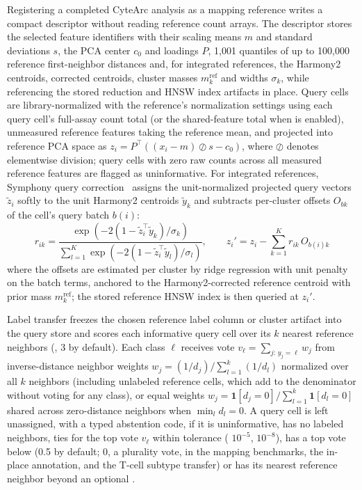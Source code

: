 \documentclass[11pt]{article}
\begin{document}
Registering a completed CyteArc analysis as a mapping reference writes a compact descriptor without reading reference count arrays. The descriptor stores the selected feature identifiers with their scaling means $m$ and standard deviations $s$, the PCA center $c_0$ and loadings $P$, 1,001 quantiles of up to 100,000 reference first-neighbor distances and, for integrated references, the Harmony2 centroids, corrected centroids, cluster masses $m_k^{\mathrm{ref}}$ and widths $\sigma_k$, while referencing the stored reduction and HNSW index artifacts in place. Query cells are library-normalized with the reference's normalization settings using each query cell's full-assay count total (or the shared-feature total when  is enabled), unmeasured reference features taking the reference mean, and projected into reference PCA space as $z_i=P^{\top}((x_i-m)\oslash s-c_0)$, where $\oslash$ denotes elementwise division; query cells with zero raw counts across all measured reference features are flagged as uninformative. For integrated references, Symphony query correction~\cite{kang2021} assigns the unit-normalized projected query vectors $\tilde z_i$ softly to the unit Harmony2 centroids $\tilde y_k$ and subtracts per-cluster offsets $O_{bk}$ of the cell's query batch $b(i)$:
\[
r_{ik}=\frac{\exp\left(-2\left(1-\tilde z_i^{\top}\tilde y_k\right)/\sigma_k\right)}{\sum_{l=1}^{K}\exp\left(-2\left(1-\tilde z_i^{\top}\tilde y_l\right)/\sigma_l\right)},\qquad z_i'=z_i-\sum_{k=1}^{K}r_{ik}\,O_{b(i)k}
\]
where the offsets are estimated per cluster by ridge regression with unit penalty on the batch terms, anchored to the Harmony2-corrected reference centroid with prior mass $m_k^{\mathrm{ref}}$; the stored reference HNSW index is then queried at $z_i'$.

Label transfer freezes the chosen reference label column or cluster artifact into the query store and scores each informative query cell over its $k$ nearest reference neighbors (, 3 by default). Each class $\ell$ receives vote $v_{\ell}=\sum_{j:\,y_j=\ell}w_j$ from inverse-distance neighbor weights $w_j=(1/d_j)/\sum_{l=1}^{k}(1/d_l)$ normalized over all $k$ neighbors (including unlabeled reference cells, which add to the denominator without voting for any class), or equal weights $w_j=\mathbf{1}[d_j=0]/\sum_{l=1}^{k}\mathbf{1}[d_l=0]$ shared across zero-distance neighbors when $\min_l d_l=0$. A query cell is left unassigned, with a typed abstention code, if it is uninformative, has no labeled neighbors, ties for the top vote $v_{\ell}$ within  tolerance ( $10^{-5}$,  $10^{-8}$), has a top vote below  (0.5 by default; 0, a plurality vote, in the mapping benchmarks, the in-place annotation, and the T-cell subtype transfer) or has its nearest reference neighbor beyond an optional .
\end{document}
